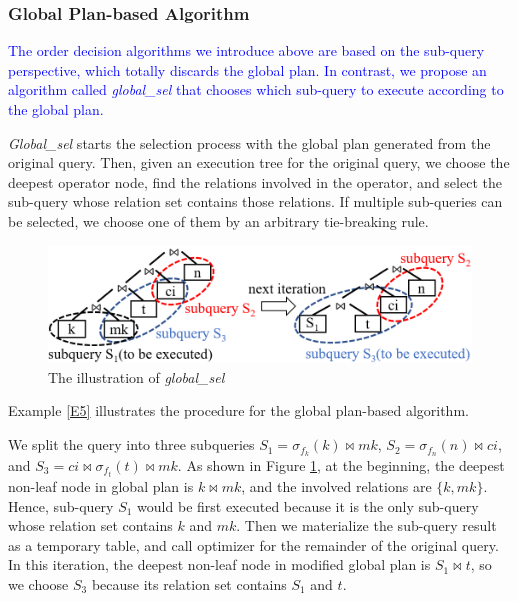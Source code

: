     \subsubsection{Global Plan-based Algorithm} \label{S422}
\textcolor{blue}{
    The order decision algorithms we introduce above are based on the sub-query perspective, which totally discards the global plan. In contrast, we propose an algorithm called \textit{global\_sel} that chooses which sub-query to execute according to the global plan.
}\par
    \textit{Global\_sel} starts the selection process with the global plan generated from the original query. Then, given an execution tree for the original query, we choose the deepest operator node, find the relations involved in the operator, and select the sub-query whose relation set contains those relations. If multiple sub-queries can be selected, we choose one of them by an arbitrary tie-breaking rule.
    \begin{figure}[htb]  
        \includegraphics[width=\linewidth]{./pic/Figure8.png}
        \centering
        \caption{The illustration of \textit{global\_sel}}
        \label{F8}
        \Description{}
    \end{figure}\par
    Example \ref{E5} illustrates the procedure for the global plan-based algorithm.
    \begin{Example} \label{E5}
        We split the query into three subqueries $S_1=\sigma_{f_k}(k) \bowtie mk$, $S_2=\sigma_{f_n}(n) \bowtie ci$, and $S_3=ci \bowtie \sigma_{f_t}(t) \bowtie mk$. As shown in Figure \ref{F8}, at the beginning, the deepest non-leaf node in global plan is $k \bowtie mk$, and the involved relations are $\{k,mk\}$. Hence, sub-query $S_1$ would be first executed because it is the only sub-query whose relation set contains $k$ and $mk$. Then we materialize the sub-query result as a temporary table, and call optimizer for the remainder of the original query. In this iteration, the deepest non-leaf node in modified global plan is $S_1 \bowtie t$, so we choose $S_3$ because its relation set contains $S_1$ and $t$.
    \end{Example}